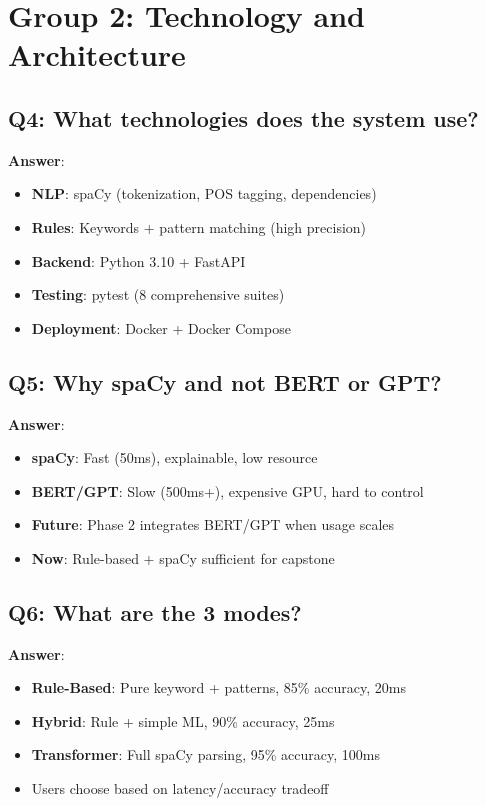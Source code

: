 \documentclass[12pt,a4paper]{report}
\begin{document}
\section{Group 2: Technology and Architecture}

\subsection{Q4: What technologies does the system use?}

\textbf{Answer}:
\begin{itemize}
    \item \textbf{NLP}: spaCy (tokenization, POS tagging, dependencies)
    \item \textbf{Rules}: Keywords + pattern matching (high precision)
    \item \textbf{Backend}: Python 3.10 + FastAPI
    \item \textbf{Testing}: pytest (8 comprehensive suites)
    \item \textbf{Deployment}: Docker + Docker Compose
\end{itemize}

\subsection{Q5: Why spaCy and not BERT or GPT?}

\textbf{Answer}:
\begin{itemize}
    \item \textbf{spaCy}: Fast (50ms), explainable, low resource
    \item \textbf{BERT/GPT}: Slow (500ms+), expensive GPU, hard to control
    \item \textbf{Future}: Phase 2 integrates BERT/GPT when usage scales
    \item \textbf{Now}: Rule-based + spaCy sufficient for capstone
\end{itemize}

\subsection{Q6: What are the 3 modes?}

\textbf{Answer}:
\begin{itemize}
    \item \textbf{Rule-Based}: Pure keyword + patterns, 85\% accuracy, 20ms
    \item \textbf{Hybrid}: Rule + simple ML, 90\% accuracy, 25ms
    \item \textbf{Transformer}: Full spaCy parsing, 95\% accuracy, 100ms
    \item Users choose based on latency/accuracy tradeoff
\end{itemize}
\end{document}
